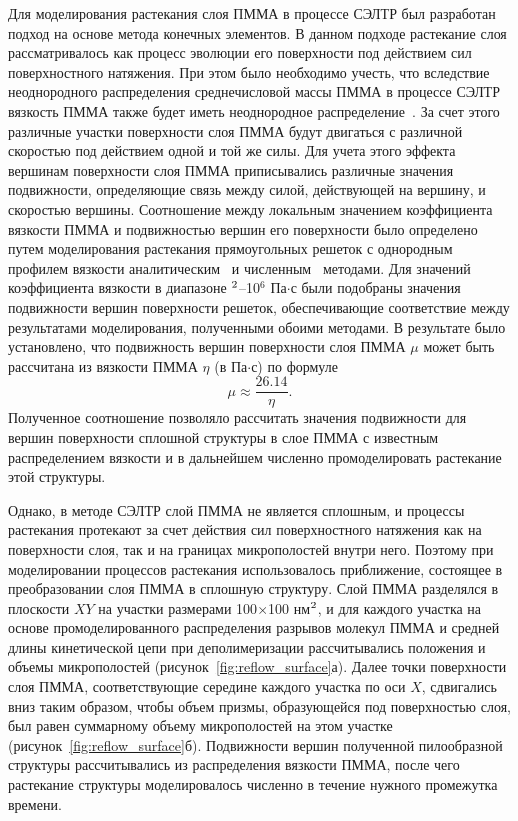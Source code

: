 Для моделирования растекания слоя ПММА в процессе СЭЛТР был разработан подход на основе метода конечных элементов.
В данном подходе растекание слоя рассматривалось как процесс эволюции его поверхности под действием сил поверхностного натяжения.
При этом было необходимо учесть, что вследствие неоднородного распределения среднечисловой массы ПММА в процессе СЭЛТР вязкость ПММА также будет иметь неоднородное распределение~\cite{Leveder_2010}.
За счет этого различные участки поверхности слоя ПММА будут двигаться с различной скоростью под действием одной и той же силы.
Для учета этого эффекта вершинам поверхности слоя ПММА приписывались различные значения подвижности, определяющие связь между силой, действующей на вершину, и скоростью вершины.
Соотношение между локальным значением коэффициента вязкости ПММА и подвижностью вершин его поверхности было определено путем моделирования растекания прямоугольных решеток с однородным профилем вязкости аналитическим~\cite{Leveder_2010} и численным~\cite{Brakke_SE} методами.
Для значений коэффициента вязкости в диапазоне $^\text{2}$--10$^{\text{6}}$ Па$\cdot$с были подобраны значения подвижности вершин поверхности решеток, обеспечивающие соответствие между результатами моделирования, полученными обоими методами.
В результате было установлено, что подвижность вершин поверхности слоя ПММА $\mu$ может быть рассчитана из вязкости ПММА $\eta$ (в Па$\cdot$с) по формуле
\begin{equation}
	\mu \approx \frac{26.14}{\eta}.
\end{equation}
Полученное соотношение позволяло рассчитать значения подвижности для вершин поверхности сплошной структуры в слое ПММА с известным распределением вязкости и в дальнейшем численно промоделировать растекание этой структуры.

Однако, в методе СЭЛТР слой ПММА не является сплошным, и процессы растекания протекают за счет действия сил поверхностного натяжения как на поверхности слоя, так и на границах микрополостей внутри него.
Поэтому при моделировании процессов растекания использовалось приближение, состоящее в преобразовании слоя \linebreak ПММА в сплошную структуру.
Слой ПММА разделялся в плоскости $XY$ на участки размерами 100$\times$100 нм$^\text{2}$, и для каждого участка на основе промоделированного распределения разрывов молекул ПММА и средней длины кинетической цепи при деполимеризации рассчитывались положения и объемы микрополостей (рисунок~\ref{fig:reflow_surface}а).
Далее точки поверхности слоя ПММА, соответствующие середине каждого участка по оси $X$, сдвигались вниз таким образом, чтобы объем призмы, образующейся под поверхностью слоя, был равен суммарному объему микрополостей на этом участке (рисунок~\ref{fig:reflow_surface}б).
Подвижности вершин полученной пилообразной структуры рассчитывались из распределения вязкости ПММА, после чего растекание структуры моделировалось численно в течение нужного промежутка времени.

